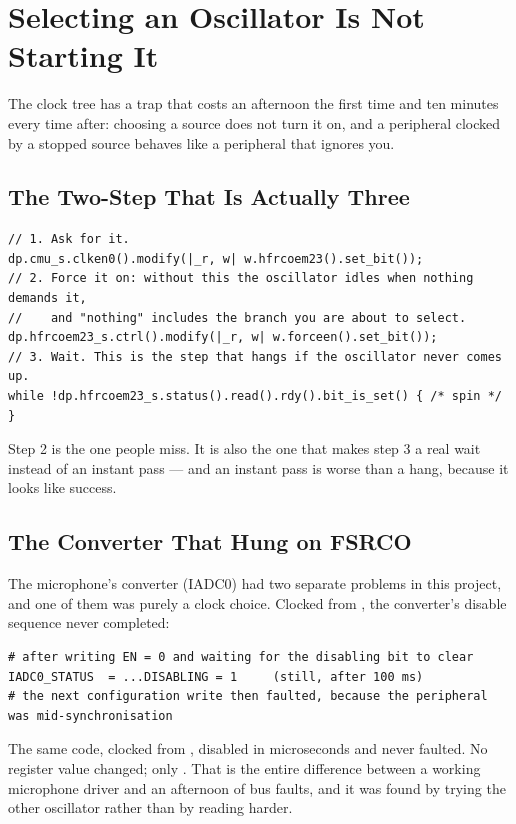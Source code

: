 \section{Selecting an Oscillator Is Not Starting It}
\label{sec:clocks-starting}

The clock tree has a trap that costs an afternoon the first time and ten minutes every time after:
choosing a source does not turn it on, and a peripheral clocked by a stopped source behaves like a
peripheral that ignores you.

\subsection{The Two-Step That Is Actually Three}

\begin{verbatim}
// 1. Ask for it.
dp.cmu_s.clken0().modify(|_r, w| w.hfrcoem23().set_bit());
// 2. Force it on: without this the oscillator idles when nothing demands it,
//    and "nothing" includes the branch you are about to select.
dp.hfrcoem23_s.ctrl().modify(|_r, w| w.forceen().set_bit());
// 3. Wait. This is the step that hangs if the oscillator never comes up.
while !dp.hfrcoem23_s.status().read().rdy().bit_is_set() { /* spin */ }
\end{verbatim}

Step 2 is the one people miss. It is also the one that makes step 3 a real wait instead of an
instant pass — and an instant pass is worse than a hang, because it looks like success.

\subsection{The Converter That Hung on FSRCO}

The microphone's converter (IADC0) had two separate problems in this project, and one of them was
purely a clock choice. Clocked from , the converter's disable sequence never
completed:

\begin{verbatim}
# after writing EN = 0 and waiting for the disabling bit to clear
IADC0_STATUS  = ...DISABLING = 1     (still, after 100 ms)
# the next configuration write then faulted, because the peripheral was mid-synchronisation
\end{verbatim}

The same code, clocked from , disabled in microseconds and never faulted. No
register value changed; only . That is the entire difference between a
working microphone driver and an afternoon of bus faults, and it was found by trying the other
oscillator rather than by reading harder.

